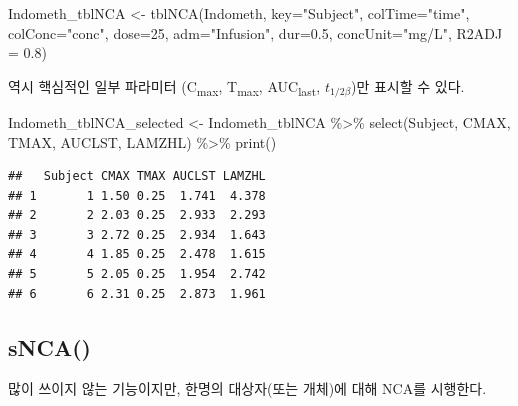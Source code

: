 \documentclass[
  11pt,
  krantz2, a4paper, twoside]{krantz}
\newenvironment{Shaded}{\begin{snugshade}}{\end{snugshade}}
\newcommand{\AttributeTok}[1]{\textcolor[rgb]{0.77,0.63,0.00}{#1}}
\newcommand{\CommentTok}[1]{\textcolor[rgb]{0.56,0.35,0.01}{\textit{#1}}}
\newcommand{\DecValTok}[1]{\textcolor[rgb]{0.00,0.00,0.81}{#1}}
\newcommand{\FloatTok}[1]{\textcolor[rgb]{0.00,0.00,0.81}{#1}}
\newcommand{\FunctionTok}[1]{\textcolor[rgb]{0.00,0.00,0.00}{#1}}
\newcommand{\NormalTok}[1]{#1}
\newcommand{\OtherTok}[1]{\textcolor[rgb]{0.56,0.35,0.01}{#1}}
\newcommand{\SpecialCharTok}[1]{\textcolor[rgb]{0.00,0.00,0.00}{#1}}
\newcommand{\StringTok}[1]{\textcolor[rgb]{0.31,0.60,0.02}{#1}}
\theoremstyle{definition}
\theoremstyle{definition}
\theoremstyle{definition}
\theoremstyle{definition}
\theoremstyle{remark}
\begin{document}
\begin{Shaded}
\begin{Highlighting}[]
\NormalTok{Indometh\_tblNCA }\OtherTok{\textless{}{-}} \FunctionTok{tblNCA}\NormalTok{(Indometh, }\AttributeTok{key=}\StringTok{"Subject"}\NormalTok{, }
                          \AttributeTok{colTime=}\StringTok{"time"}\NormalTok{, }\AttributeTok{colConc=}\StringTok{"conc"}\NormalTok{, }\AttributeTok{dose=}\DecValTok{25}\NormalTok{, }
                          \AttributeTok{adm=}\StringTok{"Infusion"}\NormalTok{, }\AttributeTok{dur=}\FloatTok{0.5}\NormalTok{, }
                          \AttributeTok{concUnit=}\StringTok{"mg/L"}\NormalTok{, }\AttributeTok{R2ADJ =} \FloatTok{0.8}\NormalTok{)}
\end{Highlighting}
\end{Shaded}

역시 핵심적인 일부 파라미터 (C\textsubscript{max}, T\textsubscript{max}, AUC\textsubscript{last}, \(t_{1/2\beta}\))만 표시할 수 있다.

\begin{Shaded}
\begin{Highlighting}[]
\NormalTok{Indometh\_tblNCA\_selected }\OtherTok{\textless{}{-}}\NormalTok{ Indometh\_tblNCA }\SpecialCharTok{\%\textgreater{}\%} 
  \FunctionTok{select}\NormalTok{(Subject, CMAX, TMAX, AUCLST, LAMZHL) }\SpecialCharTok{\%\textgreater{}\%} 
  \FunctionTok{print}\NormalTok{()}
\end{Highlighting}
\end{Shaded}

\begin{verbatim}
##   Subject CMAX TMAX AUCLST LAMZHL
## 1       1 1.50 0.25  1.741  4.378
## 2       2 2.03 0.25  2.933  2.293
## 3       3 2.72 0.25  2.934  1.643
## 4       4 1.85 0.25  2.478  1.615
## 5       5 2.05 0.25  1.954  2.742
## 6       6 2.31 0.25  2.873  1.961
\end{verbatim}

\hypertarget{snca}{%
\subsection{sNCA()}\label{snca}}

많이 쓰이지 않는 기능이지만, 한명의 대상자(또는 개체)에 대해 NCA를 시행한다.

\begin{Shaded}
\end{Shaded}
\end{document}
